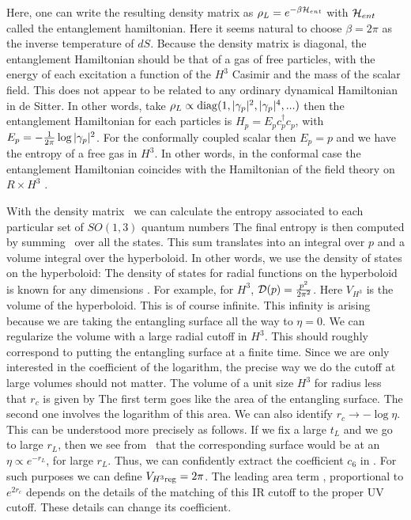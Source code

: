 Here, one can write the resulting density matrix as $\rho_L=e^{-\beta {\cal H}_{ent}}$ with ${\cal H}_{ent}$ called the entanglement hamiltonian. Here it seems natural to choose
 $\beta = 2 \pi$ as the inverse temperature of $dS$. Because the density matrix is diagonal, the entanglement Hamiltonian should be that of a gas of free particles, with the energy of each excitation a function of the $H^3$ Casimir and the mass of the scalar field. This does not appear to be related to any ordinary
dynamical Hamiltonian in de Sitter.
In other words, take $\rho_L  \propto 
{\rm diag} (1,|\gamma_p|^2,|\gamma_p|^4,...)$ then the entanglement Hamiltonian for each particles is
 $H_p =  E_p c^\dagger_p c_p$, with $E_p = -{1 \over 2\pi} \log |\gamma_p|^2$. For the conformally coupled scalar then $E_p = p$ and we have the entropy of a free gas  in $H^3$.
In other words, in the conformal case the entanglement Hamiltonian coincides with the Hamiltonian of
the field theory on $R \times H^3$ .
 


With the density matrix \finre\ we can calculate the entropy associated to each particular set of
$SO(1,3)$ quantum numbers
\eqn{}
The final entropy is then computed by summing \entmode\ over all the states. This sum translates
into an integral over $p$ and a volume integral over the hyperboloid. In other words, we use
the density of states on the hyperboloid:
\eqn{}
The density of states for radial functions on the hyperboloid is known for any dimensions \BytsenkoBC. For example, for $H^3$, ${\cal D}(p)= { p^2 \over 2\pi^2 } $.
Here $V_{H^3}$ is the volume of the hyperboloid. This is of course infinite.
This infinity is arising because we are taking the entangling surface all the way to $\eta =0$.
We can regularize the volume with a large radial cutoff in $H^3$. This should roughly correspond to
putting the entangling surface at a finite time. Since we are only interested in the coefficient of the
logarithm, the precise way we do the cutoff at large volumes should not matter.
The volume of a unit size  $H^3$ for radius less that $r_c$ is given by
\eqn{}
The first term goes like the area of the entangling surface.
The second one involves the logarithm of this area.
 We can also identify
$r_c \to - \log \eta $. This can be understood more precisely as follows. If we fix a large  $t_L$ and we go to
large $r_L$, then we see from \angsfo \anaco\ that the corresponding surface would be at an $\eta \propto e^{ -r_L}$, for
large $r_L$.
Thus, we can confidently extract the coefficient $c_6$ in \entir . For such purposes we can define
$V_{H^3 {\rm reg} } = 2 \pi $. The leading area term , proportional to $e^{ 2 r_c}$ depends on the details
of the matching of this IR cutoff to the proper UV cutoff. These details can change its coefficient. 

